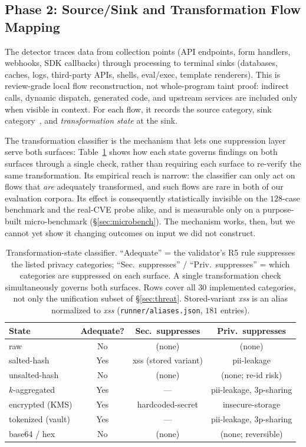 \documentclass[runningheads]{llncs}
\begin{document}
\subsection{Phase 2: Source/Sink and Transformation Flow Mapping}

The detector traces data from collection points (API endpoints, form handlers, webhooks, SDK callbacks) through processing to terminal sinks (databases, caches, logs, third-party APIs, shells, eval/exec, template renderers). This is review-grade local flow reconstruction, not whole-program taint proof: indirect calls, dynamic dispatch, generated code, and upstream services are included only when visible in context. For each flow, it records the source category, sink category~\cite{tang2023privacydata}, and \emph{transformation state} at the sink.

The transformation classifier is the mechanism that lets one suppression layer serve both surfaces: Table~\ref{tab:transform} shows how each state governs findings on both surfaces through a single check, rather than requiring each surface to re-verify the same transformation. Its empirical reach is narrow: the classifier can only act on flows that \emph{are} adequately transformed, and such flows are rare in both of our evaluation corpora. Its effect is consequently statistically invisible on the $128$-case benchmark and the real-CVE probe alike, and is measurable only on a purpose-built micro-benchmark (\S\ref{sec:microbench}). The mechanism works, then, but we cannot yet show it changing outcomes on input we did not construct.

\begin{table}[htbp]
\centering
\footnotesize
\setlength{\tabcolsep}{2pt}
\begin{tabular}{lccc}
\toprule
\textbf{State} & \textbf{Adequate?} & \textbf{Sec.\ suppresses} & \textbf{Priv.\ suppresses} \\
\midrule
raw              & No  & (none)         & (none) \\
salted-hash      & Yes & xss (stored variant) & pii-leakage \\
unsalted-hash    & No  & (none)         & (none; re-id risk) \\
$k$-aggregated   & Yes & ---            & pii-leakage, 3p-sharing \\
encrypted (KMS)  & Yes & hardcoded-secret & insecure-storage \\
tokenized (vault)& Yes & ---            & pii-leakage, 3p-sharing \\
base64 / hex     & No  & (none)         & (none; reversible) \\
\bottomrule
\end{tabular}
\caption{Transformation-state classifier. ``Adequate'' = the validator's R5 rule suppresses the listed privacy categories; ``Sec.\ suppresses'' / ``Priv.\ suppresses'' = which categories are suppressed on each surface. A single transformation check simultaneously governs both surfaces. Rows cover all $30$ implemented categories, not only the unification subset of \S\ref{sec:threat}. Stored-variant \emph{xss} is an alias normalized to \emph{xss} (\texttt{runner/aliases.json}, $181$ entries).}
\label{tab:transform}
\end{table}
\end{document}
